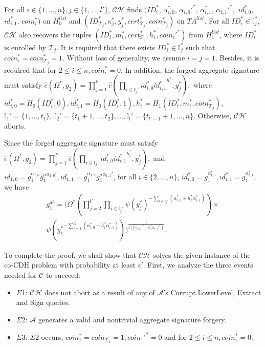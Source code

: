 \documentclass[10pt,journal,compsoc]{IEEEtran}
\begin{document}
For all $i\in\{1,...,n\},j\in \{1,...,l'\}$, $\mathcal {CH}$ finds
$(ID_i^*$, $\alpha_{i,0}^*$, $\alpha_{i,0}'^*$, $\alpha_{i,1}^*$,
$\alpha_{i,1}'^*,$ $id_{i,0}^*$, $id_{i,1}^*$, $coin_i^*)$ on
$H_0^{list}$ and
$(ID_{\mathcal{T}_j}^*,\kappa_j^*,y_j^*,cert_{\mathcal{T}_j}^*,coin_{\mathcal{T}_j}^*)$
on $TA^{list}$. For all $ID_i^*\in \mathbb{I}_j^*$, $\mathcal {CH}$
also recovers the tuples $(ID_i^*, m_i^*,
cert_{\mathcal{T}_j}^*,h_i^*, coin_i'^*)$ from $H_1^{list}$, where
$ID_i^*$ is enrolled by $\mathcal{T}_j$. It is required that there
exists $ID_i^*\in \mathbb{I}_j^*$ such that
$coin_i^*=coin_{\mathcal{T}_j}^*=1$. Without loss of generality, we
assume $i=j=1$. Besides, it is required that for $2\leq i\leq n,
coin_i^*=0$. In addition, the forged aggregate signature must
satisfy
$\hat{e}(\Omega^*,g_2)=\prod_{j=1}^{l'} \hat{e}(\prod_{i\in \mathbb{I}_j'}id_{i,0}^*
      {id_{i,1}^*}^{h_i^*},y_j^*),$ where
$id_{i,0}^*=H_0(ID_i^*,0),id_{i,1}^*=H_0(ID_i^*,1),h_i^*=H_1(ID_i^*,m_i^*,coin_{\mathcal{T}_j}^*)$,
$\mathbb{I}_1'=\{1,...,t_1\}$, $\mathbb{I}_2'=\{t_1+1,...,t_2\}
,...,\mathbb{I}_l'=\{t_{l'-1}+1,...,n\}$. Otherwise, $\mathcal {CH}$
aborts.

Since the forged aggregate signature must satisfy
$\hat{e}(\Omega^*,g_2)=\prod_{j=1}^{l'} \hat{e}(\prod_{i\in \mathbb{I}_j'}id_{i,0}^*
      {id_{i,1}^*}^{h_i^*},y_j^*),$
and
$id_{1,0}=g_1^{\alpha_{1,0}}{g_1^a}^{\alpha_{1,0}'},id_{1,1}=g_1^{\alpha_{1,1}}{g_1^a}^{\alpha_{1,1}'}$,
for all $i\in \{2,...,n\}$,
$id_{i,0}^*=g_1^{\alpha_{i,0}^*},id_{i,1}^*=g_1^{\alpha_{i,1}^*}$,
we have
\begin{eqnarray*}
g_1^{ab}=(\Omega^*
(\prod_{j=2}^{l'}\prod_{i\in \mathbb{I}_j'}\psi(y_j^*)^{-\sum_{i\in \mathbb{I}_j'}(\alpha_{i,0}^*+h_i^*\alpha_{i,1}^*)})\times\\
      \psi({y_1^*}^{-\sum_{i=1}^{t_1}(\alpha_{i,0}^*+h_i^*\alpha_{i,1}^*)}))^{\frac{1}{\kappa_1^*(\alpha_{1,0}'^*+h_1^*\alpha_{1,1}'^*)}}.
\end{eqnarray*}


To complete the proof, we shall show that $\mathcal {CH}$ solves the
given instance of the co-CDH problem with probability at least
$\epsilon'$. First, we analyze the three events needed for $\mathcal
{C}$ to succeed:

\begin{itemize}
  \item $\Sigma$1: $\mathcal {CH}$ does not abort as a result of any of
  $\mathcal {A}$'s {\sf Corrupt.LowerLevel}, {\sf Extract} and {\sf Sign}
queries.
  \item $\Sigma$2: $\mathcal {A}$ generates a valid and nontrivial aggregate signature
forgery.
  \item $\Sigma$3: $\Sigma$2 occurs, $coin_1^*=coin_{\mathcal{T}_1}=1,coin_1'^*=0$ and for $2\leq i\leq n, coin_i^*=0$.
\end{itemize}
\end{document}
